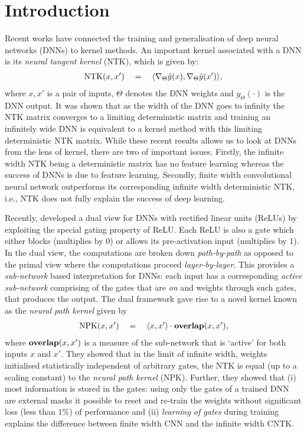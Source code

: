 \section{Introduction}
Recent works have connected the training  and generalisation of deep neural networks (DNNs) to kernel methods. An important kernel associated with a DNN is its \emph{neural tangent kernel} (NTK), which is given by:
\begin{align*}
 \text{NTK}(x,x')\quad = \quad \langle \nabla_{\Theta}\hat{y}(x), \nabla_{\Theta}\hat{y}(x')\rangle,
\end{align*}
where $x,x'$ is a pair of inputs, $\Theta$ denotes the DNN weights and $\hat{y}_\Theta(\cdot)$ is the DNN output. It was shown that as the width of the DNN goes to infinity the NTK matrix converges to a limiting deterministic matrix and training an infinitely wide DNN is equivalent to a kernel method with this limiting deterministic NTK matrix. While these recent results allows us to look at DNNs from the lens of kernel, there are two of important issues. Firstly, the infinite width NTK being a deterministic matrix has no feature learning whereas the success of DNNs is due to feature learning. Secondly, finite width convolutional neural network outperforms its corresponding infinite width deterministic NTK, i.e., NTK does not fully explain the success of deep learning.

Recently, \citet{npk} developed a dual view for DNNs with rectified linear units (ReLUs) by exploiting the special gating property of ReLU. Each ReLU is also a gate which either blocks (multiplies by 0) or allows its pre-activation input (multiplies by 1). In the dual view, the computations are broken down \emph{path-by-path} as opposed to the primal view where the computations proceed \emph{layer-by-layer}. This provides a \emph{sub-network} based interpretation for DNNs: each input has a corresponding \emph{active sub-network} comprising of the gates that are \emph{on} and weights through such gates, that produces the output. The dual framework gave rise to a novel kernel known as the \emph{neural path kernel} given by 
\begin{align*}
 \text{NPK}(x,x')\quad =\quad \langle x,x'\rangle\cdot {\bf{overlap}}(x,x'),
\end{align*}
where ${\bf{overlap}}(x,x')$ is a measure of the sub-network that is `active' for both inputs $x$ and $x'$. They showed that in the limit of infinite width, weights initialised statistically independent of arbitrary gates, the NTK is equal (up to a scaling constant) to the \emph{neural path kernel} (NPK). Further, they showed that (i) most information is stored in the gates: using only the gates of a trained DNN are external masks it possible to reset and re-train the weights without significant loss (less than $1\%$) of performance and (ii) \emph{learning of gates} during training explains the difference between finite width CNN and the infinite width CNTK. 

